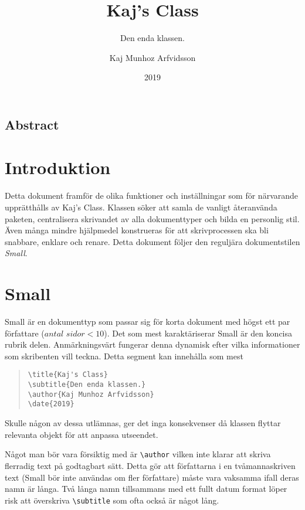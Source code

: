 \documentclass[Swedish,long,twocolumn]{KajsClass}
\title{Kaj's Class}
\subtitle{Den enda klassen.}
\author{Kaj Munhoz Arfvidsson}
\date{2019}
\begin{document}
\maketitle

\begin{overview}
    \section*{Abstract}
    \blindtext
\end{overview}

\section{Introduktion}
Detta dokument framför de olika funktioner och inställningar som för närvarande upprätthålls av Kaj's Class. Klassen söker att samla de vanligt återanvända paketen, centralisera skrivandet av alla dokumenttyper och bilda en personlig stil. Även många mindre hjälpmedel konstrueras för att skrivprocessen ska bli snabbare, enklare och renare. Detta dokument följer den reguljära dokumentstilen \textit{Small}.

\segline
\section{Small}\label{sec:Small}
Small är en dokumenttyp som passar sig för korta dokument med högst ett par författare ($\textit{antal sidor} < 10$). Det som mest karaktäriserar Small är den koncisa rubrik delen. Anmärkningsvärt fungerar denna dynamisk efter vilka informationer som skribenten vill teckna. Detta segment kan innehålla som mest

\begin{minipage}{\textwidth}
\begin{quote}\begin{verbatim}
\title{Kaj's Class}
\subtitle{Den enda klassen.}
\author{Kaj Munhoz Arfvidsson}
\date{2019}
\end{verbatim}\end{quote}\end{minipage}

Skulle någon av dessa utlämnas, ger det inga konsekvenser då klassen flyttar relevanta objekt för att anpassa utseendet. 

Något man bör vara försiktig med är \verb|\author| vilken inte klarar att skriva flerradig text på godtagbart sätt. Detta gör att författarna i en tvåmannaskriven text (Small bör inte användas om fler författare) måste vara vaksamma ifall deras namn är långa. Två långa namn tillsammans med ett fullt datum format löper risk att överskriva \verb|\subtitle| som ofta också är något lång.
\end{document}
